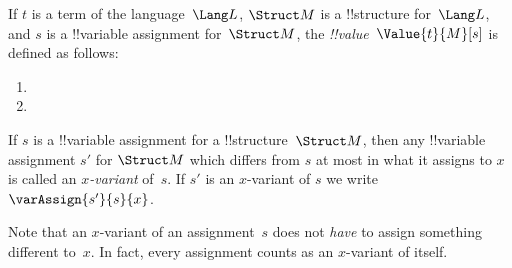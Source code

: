\documentclass[../../../include/open-logic-section]{subfiles}
\begin{document}
\begin{defn}
If $t$ is a term of the language~$\Lang L$, $\Struct M$ is a
!!{structure} for~$\Lang L$, and $s$ is a !!{variable} assignment
for~$\Struct M$, the \emph{!!{value}}~$\Value{t}{M}[s]$ is defined as
follows:
\begin{enumerate}
\item {}
\item {}
\end{enumerate}
\end{defn}

\begin{defn}[$x$-Variant]
If $s$ is a !!{variable} assignment for a !!{structure}~$\Struct M$, then any
!!{variable} assignment $s'$ for $\Struct M$ which differs from $s$ at most
in what it assigns to $x$ is called an \emph{$x$-variant} of~$s$.  If
$s'$ is an $x$-variant of $s$ we write $\varAssign{s'}{s}{x}$.
\end{defn}

\begin{explain}
Note that an $x$-variant of an assignment~$s$ does not \emph{have} to
assign something different to~$x$.  In fact, every assignment counts
as an $x$-variant of itself.
\end{explain}
\end{document}
